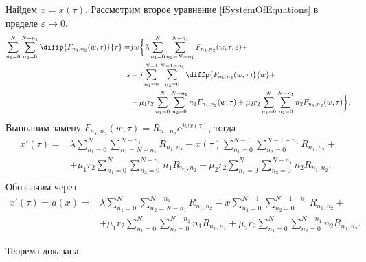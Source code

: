 Найдем $x=x(\tau)$. Рассмотрим второе уравнение \eqref{fSystemOfEquations} в пределе $\varepsilon \rightarrow 0$.
\begin{align*}
\sum_{n_1=0}^N\sum_{n_2=0}^{N-n_1} \diffp{F_{n_{1}, n_{2}}(w,\tau)}{\tau}=
&jw\bigg\{\lambda \sum_{n_1=0}^N\sum_{n_2=N-n_1}^{N-n_1} 
F_{n_{1}, n_{2}}(w,\tau, \varepsilon)+\\s
&+ j\sum_{n_1=0}^{N-1}\sum_{n_2=0}^{N-1-n_1} 
\diffp{F_{n_{1}, n_{2}}(w,\tau)}{w}+\\
&+\mu_1 r_2 \sum_{n_1=0}^{N}\sum_{n_2=0}^{N-n_1} 
n_1 F_{n_{1}, n_{2}}(w,\tau)
+\mu_2 r_2 \sum_{n_1=0}^{N}\sum_{n_2=0}^{N-n_1} 
n_2 F_{n_{1}, n_{2}}(w,\tau)\bigg\}.\\
\end{align*} 
Выполним замену $F_{n_{1}, n_{2}}(w,\tau)=R_{n_{1}, n_{2}}e^{jwx(\tau)}$, тогда
\begin{equation*}
	\begin{aligned}
		x'(\tau) =
		&\lambda \sum_{n_1=0}^N\sum_{n_2=N-n_1}^{N-n_1} 
		R_{n_{1}, n_{2}}
		- x(\tau)\sum_{n_1=0}^{N-1}\sum_{n_2=0}^{N-1-n_1} 
		R_{n_{1}, n_{2}}+\\
		&+\mu_1 r_2 \sum_{n_1=0}^{N}\sum_{n_2=0}^{N-n_1} 
		n_1 R_{n_{1}, n_{2}}
		+\mu_2 r_2 \sum_{n_1=0}^{N}\sum_{n_2=0}^{N-n_1} 
		n_2 R_{n_{1}, n_{2}}.\\
	\end{aligned}
\end{equation*}
Обозначим через
\begin{equation}\label{a_func}
	\begin{aligned}
		x'(\tau)=a(x)=&\lambda \sum_{n_1=0}^N\sum_{n_2=N-n_1}^{N-n_1} 
		R_{n_{1}, n_{2}}
		- x\sum_{n_1=0}^{N-1}\sum_{n_2=0}^{N-1-n_1} 
		R_{n_{1}, n_{2}}+\\
		&+\mu_1 r_2 \sum_{n_1=0}^{N}\sum_{n_2=0}^{N-n_1} 
		n_1 R_{n_{1}, n_{2}}
		+\mu_2 r_2 \sum_{n_1=0}^{N}\sum_{n_2=0}^{N-n_1} 
		n_2 R_{n_{1}, n_{2}}.
	\end{aligned}
\end{equation}

Теорема доказана.